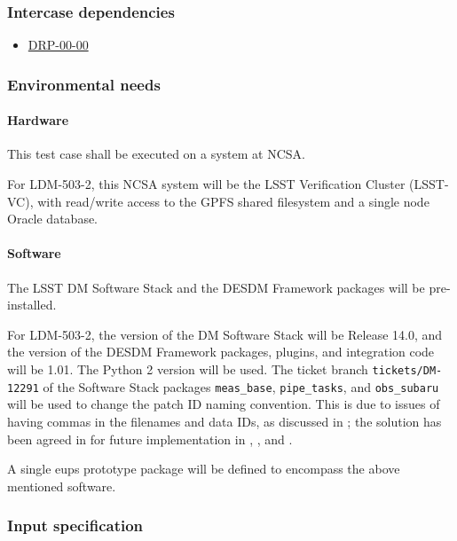 \subsubsection{Intercase dependencies}

\begin{itemize}

  \item{\hyperref[drp-00-00]{DRP-00-00}}

\end{itemize}

\subsubsection{Environmental needs}

\paragraph{Hardware}\label{sec:hardware}

This test case shall be executed on a system at NCSA.

For LDM-503-2, this NCSA system will be the LSST Verification Cluster (LSST-VC),
with read/write access to the GPFS shared filesystem and a single node Oracle database.

\paragraph{Software}\label{sec:software}
The LSST DM Software Stack and the DESDM Framework packages will be pre-installed.

For LDM-503-2, the version of the DM Software Stack will be Release 14.0, and the version of the DESDM Framework packages, plugins, and integration code will be 1.01.
The Python 2 version will be used.
The ticket branch \texttt{tickets/DM-12291} of the Software Stack packages \texttt{meas{\_}base}, \texttt{pipe{\_}tasks}, and \texttt{obs{\_}subaru} will be used to change the patch ID naming convention.
This is due to issues of having commas in the filenames and data IDs, as discussed in ; the solution has been agreed in  for future implementation in , , and .

A single eups prototype package will be defined to encompass the above mentioned software.

\subsubsection{Input specification}\label{sec:input}

